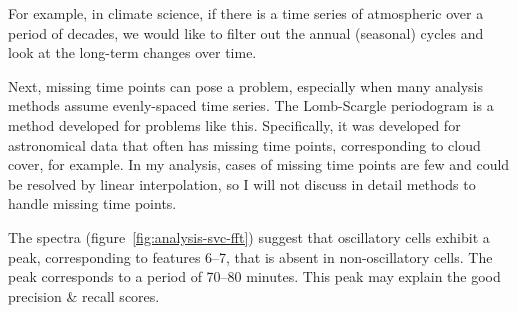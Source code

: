 For example, in climate science, if there is a time series of atmospheric  over a period of decades, we would like to filter out the annual (seasonal) cycles and look at the long-term changes over time.

Next, missing time points can pose a problem, especially when many analysis methods assume evenly-spaced time series. %
The Lomb-Scargle periodogram \parencite{lombLeastsquaresFrequencyAnalysis1976} is a method developed for problems like this.
Specifically, it was developed for astronomical data that often has missing time points, corresponding to cloud cover, for example.
In my analysis, cases of missing time points are few and could be resolved by linear interpolation, so I will not discuss in detail methods to handle missing time points.


The spectra (figure~\ref{fig:analysis-svc-fft}) suggest that oscillatory cells exhibit a peak, corresponding to features 6--7, that is absent in non-oscillatory cells.
The peak corresponds to a period of 70--80 minutes.
This peak may explain the good precision \& recall scores.

